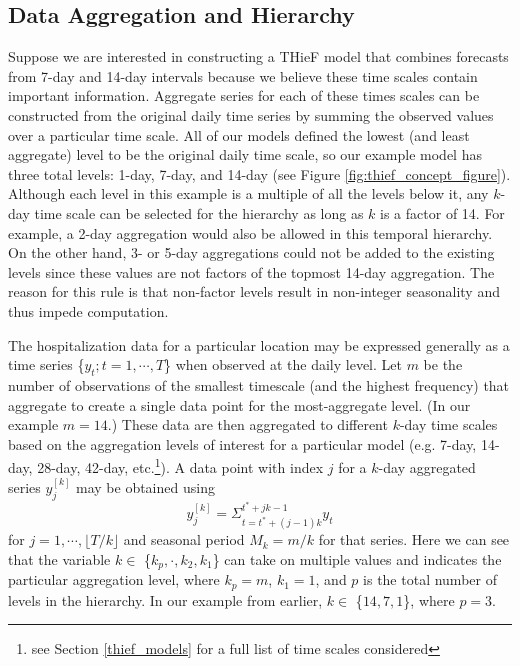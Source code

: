 \documentclass[thesis]{umassthesis}  %
\begin{document}
\subsection{Data Aggregation and Hierarchy} \label{thief_agg_hierarchy}
Suppose we are interested in constructing a THieF model that combines forecasts from 7-day and 14-day intervals because we believe these time scales contain important information. Aggregate series for each of these times scales can be constructed from the original daily time series by summing the observed values over a particular time scale\cite{thief}. All of our models defined the lowest (and least aggregate) level to be the original daily time scale, so our example model has three total levels: 1-day, 7-day, and 14-day (see Figure \ref{fig:thief_concept_figure}). Although each level in this example is a multiple of all the levels below it, any $k$-day time scale can be selected for the hierarchy as long as $k$ is a factor of 14. For example, a 2-day aggregation would also be allowed in this temporal hierarchy. On the other hand, 3- or 5-day aggregations could not be added to the existing levels since these values are not factors of the topmost 14-day aggregation. The reason for this rule is that non-factor levels result in non-integer seasonality and thus impede computation\cite{thief}.

The hospitalization data for a particular location may be expressed generally as a time series \{$y_t; t = 1, \cdots, T$\} when observed at the daily level. Let $m$ be the number of observations of the smallest timescale (and the highest frequency) that aggregate to create a single data point for the most-aggregate level. (In our example $m = 14$.) These data are then aggregated to different $k$-day time scales based on the aggregation levels of interest for a particular model (e.g. 7-day, 14-day, 28-day, 42-day, etc.\footnote{see Section \ref{thief_models} for a full list of time scales considered})\cite{thief}. A data point with index $j$ for a $k$-day aggregated series $y_j^{[k]}$ may be obtained using \[y_j^{[k]} = \Sigma_{t = t^* + (j-1)k}^{t^*+jk-1} y_t\] for $j = 1, \cdots, \lfloor T/k \rfloor$ and seasonal period $M_k = m/k$ for that series. Here we can see that the variable $k \in$ \{$k_p,\cdot,k_2,k_1$\} can take on multiple values and indicates the particular aggregation level, where $k_p = m$, $k_1 = 1$, and $p$ is the total number of levels in the hierarchy\cite{thief}. In our example from earlier, $k \in$ \{$14, 7, 1$\}, where $p = 3$.
\end{document}
